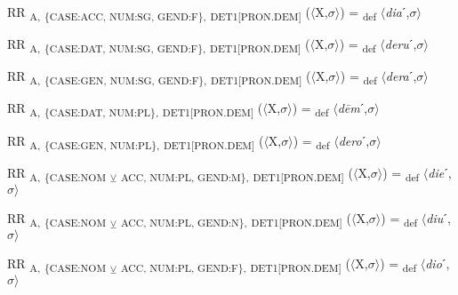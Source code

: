 {\begin{exe}
 RR \textsubscript{A,} \textsubscript{\{CASE:ACC, NUM:SG, GEND:F\},} \textsubscript{DET1[PRON.DEM]} ($\langle$X,$\sigma $$\rangle$) = \textsubscript{def} $\langle$\textit{dia}ˊ,$\sigma $$\rangle$
\end{exe}

\begin{exe}
 RR \textsubscript{A,} \textsubscript{\{CASE:DAT, NUM:SG, GEND:F\},} \textsubscript{DET1[PRON.DEM]} ($\langle$X,$\sigma $$\rangle$) = \textsubscript{def} $\langle$\textit{deru}ˊ,$\sigma $$\rangle$
\end{exe}

\begin{exe}
 RR \textsubscript{A,} \textsubscript{\{CASE:GEN, NUM:SG, GEND:F\},} \textsubscript{DET1[PRON.DEM]} ($\langle$X,$\sigma $$\rangle$) = \textsubscript{def} $\langle$\textit{dera}ˊ,$\sigma $$\rangle$
\end{exe}

\begin{exe}
 RR \textsubscript{A,} \textsubscript{\{CASE:DAT, NUM:PL\},} \textsubscript{DET1[PRON.DEM]} ($\langle$X,$\sigma $$\rangle$) = \textsubscript{def} $\langle$\textit{d\=em}ˊ,$\sigma $$\rangle$
\end{exe}

\begin{exe}
 RR \textsubscript{A,} \textsubscript{\{CASE:GEN, NUM:PL\},} \textsubscript{DET1[PRON.DEM]} ($\langle$X,$\sigma $$\rangle$) = \textsubscript{def} $\langle$\textit{dero}ˊ,$\sigma $$\rangle$
\end{exe}

\begin{exe}
 RR \textsubscript{A,} \textsubscript{\{CASE:NOM} \textsubscript{${\veebar}$}\textsubscript{ ACC, NUM:PL, GEND:M\},} \textsubscript{DET1[PRON.DEM]} ($\langle$X,$\sigma $$\rangle$) = \textsubscript{def} $\langle$\textit{die}ˊ,$\sigma $$\rangle$
\end{exe}

\begin{exe}
 RR \textsubscript{A,} \textsubscript{\{CASE:NOM} \textsubscript{${\veebar}$}\textsubscript{ ACC, NUM:PL, GEND:N\},} \textsubscript{DET1[PRON.DEM]} ($\langle$X,$\sigma $$\rangle$) = \textsubscript{def} $\langle$\textit{diu}ˊ,$\sigma $$\rangle$
\end{exe}

\begin{exe}
 RR \textsubscript{A,} \textsubscript{\{CASE:NOM} \textsubscript{${\veebar}$}\textsubscript{ ACC, NUM:PL, GEND:F\},} \textsubscript{DET1[PRON.DEM]} ($\langle$X,$\sigma $$\rangle$) = \textsubscript{def} $\langle$\textit{dio}ˊ,$\sigma $$\rangle$
\end{exe}

}
